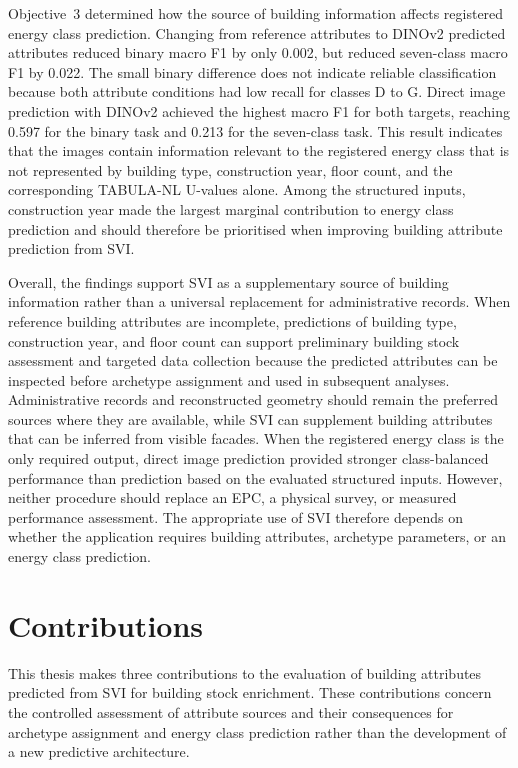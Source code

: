 Objective~3 determined how the source of building information affects registered energy class prediction.
Changing from reference attributes to DINOv2 predicted attributes reduced binary macro F1 by only 0.002, but reduced seven-class macro F1 by 0.022.
The small binary difference does not indicate reliable classification because both attribute conditions had low recall for classes D to G.
Direct image prediction with DINOv2 achieved the highest macro F1 for both targets, reaching 0.597 for the binary task and 0.213 for the seven-class task.
This result indicates that the images contain information relevant to the registered energy class that is not represented by building type, construction year, floor count, and the corresponding TABULA-NL U-values alone.
Among the structured inputs, construction year made the largest marginal contribution to energy class prediction and should therefore be prioritised when improving building attribute prediction from \ac{SVI}.

Overall, the findings support \ac{SVI} as a supplementary source of building information rather than a universal replacement for administrative records.
When reference building attributes are incomplete, predictions of building type, construction year, and floor count can support preliminary building stock assessment and targeted data collection because the predicted attributes can be inspected before archetype assignment and used in subsequent analyses.
Administrative records and reconstructed geometry should remain the preferred sources where they are available, while \ac{SVI} can supplement building attributes that can be inferred from visible facades.
When the registered energy class is the only required output, direct image prediction provided stronger class-balanced performance than prediction based on the evaluated structured inputs.
However, neither procedure should replace an \ac{EPC}, a physical survey, or measured performance assessment.
The appropriate use of \ac{SVI} therefore depends on whether the application requires building attributes, archetype parameters, or an energy class prediction.

\section{Contributions}
\label{sec:contributions}

This thesis makes three contributions to the evaluation of building attributes predicted from \ac{SVI} for building stock enrichment.
These contributions concern the controlled assessment of attribute sources and their consequences for archetype assignment and energy class prediction rather than the development of a new predictive architecture.

